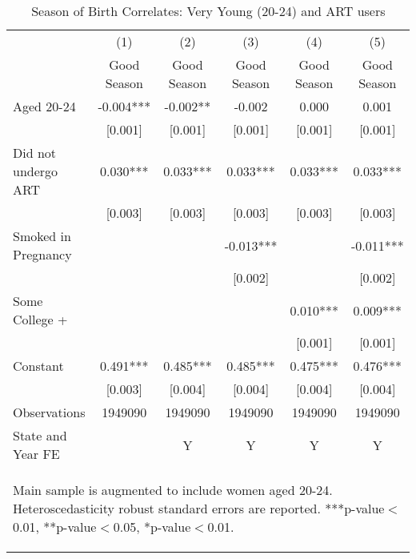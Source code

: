 \documentclass[a4paper, 12 pt]{article}
\theoremstyle{plain}
\begin{document}
\begin{doublespace}
\begin{table}[htbp]\centering
\def\sym#1{\ifmmode^{#1}\else\(^{#1}\)\fi}
\caption{Season of Birth Correlates: Very Young (20-24) and ART users\label{tab:ART2024}}
\begin{tabular}{l*{5}{c}}
\toprule
                    &\multicolumn{1}{c}{(1)}   &\multicolumn{1}{c}{(2)}   &\multicolumn{1}{c}{(3)}   &\multicolumn{1}{c}{(4)}   &\multicolumn{1}{c}{(5)}   \\
                    & Good Season   & Good Season   & Good Season   & Good Season   & Good Season   \\
\midrule
Aged 20-24          &      -0.004***&      -0.002** &      -0.002   &       0.000   &       0.001   \\
                    &     [0.001]   &     [0.001]   &     [0.001]   &     [0.001]   &     [0.001]   \\
Did not undergo ART &       0.030***&       0.033***&       0.033***&       0.033***&       0.033***\\
                    &     [0.003]   &     [0.003]   &     [0.003]   &     [0.003]   &     [0.003]   \\
Smoked in Pregnancy &               &               &      -0.013***&               &      -0.011***\\
                    &               &               &     [0.002]   &               &     [0.002]   \\
Some College +      &               &               &               &       0.010***&       0.009***\\
                    &               &               &               &     [0.001]   &     [0.001]   \\
Constant            &       0.491***&       0.485***&       0.485***&       0.475***&       0.476***\\
                    &     [0.003]   &     [0.004]   &     [0.004]   &     [0.004]   &     [0.004]   \\
\midrule
Observations        &     1949090   &     1949090   &     1949090   &     1949090   &     1949090   \\
State and Year FE&&Y&Y&Y&Y\\  \bottomrule
\multicolumn{6}{p{15cm}}{\begin{footnotesize}Main sample is augmented to include women aged 20-24. Heteroscedasticity robust standard errors are reported.
***p-value$<$0.01, **p-value$<$0.05, *p-value$<$0.01.
 \end{footnotesize}}\end{tabular}\end{table}





\end{doublespace}
\end{document}

